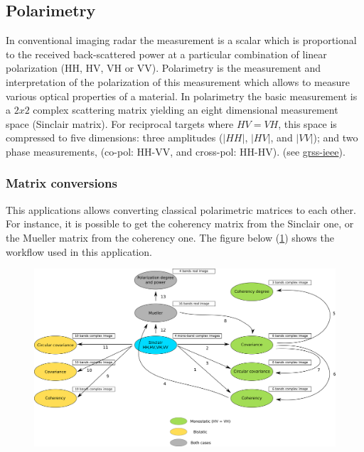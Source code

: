 \subsection{Polarimetry}

In conventional imaging radar the measurement is a scalar which is proportional
to the received back-scattered power at a particular combination of linear
polarization (HH, HV, VH or VV). 
Polarimetry is the measurement and interpretation of the polarization of this
measurement which allows to measure various optical properties of a material.
In polarimetry the basic measurement is a $2x2$ complex scattering matrix
yielding an eight dimensional measurement space (Sinclair matrix). For
reciprocal targets where $HV=VH$, this space is compressed to five dimensions:
three amplitudes ($|HH|$, $|HV|$, and $|VV|$); and two phase measurements,
(co-pol: HH-VV, and cross-pol:
HH-HV). (see \href{http://www.grss-ieee.org/technical-briefs/imaging-radar-polarimetry}{grss-ieee}).

\subsubsection{Matrix conversions}

This applications allows converting classical polarimetric matrices to each
other.  For instance, it is possible to get the coherency matrix from the
Sinclair one, or the Mueller matrix from the coherency one.  The figure below
(\ref{fig:polconv}) shows the workflow used in this application.

\begin{figure}[!h]
  \centering
   \includegraphics[width=\textwidth]{../Art/SARImages/sarpol_conversion_schema.png}
  \label{fig:polconv}
\end{figure}

